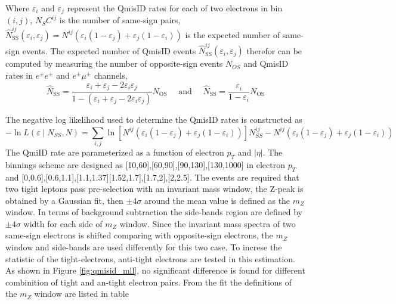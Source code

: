 Where $\varepsilon_{i}$ and $\varepsilon_{j}$ represent the QmisID rates for each of two electrons in bin$(i,j)$, $N_SC^{i j}$ is the number of same-sign pairs,$\hat{N}_{\mathrm{SS}}^{i j}\left(\varepsilon_{i}, \varepsilon_{j}\right) = N^{ij}(\varepsilon_{i}(1-\varepsilon_{j})+\varepsilon_{j}(1-\varepsilon_{i}))$ is the expected number of same-sign events. The expected number of QmisID events $\hat{N}_{\mathrm{SS}}^{i j}\left(\varepsilon_{i}, \varepsilon_{j}\right)$ therefor can be computed by measuring the number of opposite-sign events $N_{OS}$ and QmisID rates in $e^{\pm}e^{\pm}$ and $e^{\pm}\mu^{\pm}$ channels,
\begin{equation}
\hat{N}_{\mathrm{SS}}=\frac{\varepsilon_{i}+\varepsilon_{j}-2 \varepsilon_{i} \varepsilon_{j}}{1-\left(\varepsilon_{i}+\varepsilon_{j}-2 \varepsilon_{i} \varepsilon_{j}\right)} N_{\mathrm{OS}} \quad \text { and } \quad \hat{N}_{\mathrm{SS}}=\frac{\varepsilon_{i}}{1-\varepsilon_{i}} N_{\mathrm{OS}}
\end{equation}

The negative log likelihood used to determine the QmisID rates is constructed as 
\begin{equation}
-\ln L\left(\varepsilon \mid N_{S S}, N\right)=\sum_{i, j} \ln \left[N^{i j}\left(\varepsilon_{i}(1-\varepsilon_{j})+\varepsilon_{j}(1- \varepsilon_{i})\right)\right] N_{S S}^{i j}-N^{i j}\left(\varepsilon_{i}(1-\varepsilon_{j})+\varepsilon_{j}(1- \varepsilon_{i})\right)
 \end{equation}
The QmiID rate are parameterized as a function of electron $p_T$ and $|\eta|$. The binnings scheme are designed as [10,60],[60,90],[90,130],[130,1000] in electron $p_T$ and [0,0.6],[0.6,1.1],[1.1,1.37][1.52,1.7],[1.7,2],[2,2.5]. The events are required that two tight leptons pass pre-selection with an invariant mass window, the Z-peak is obtained by a Gaussian fit, then $\pm4\sigma$ around the mean value is defined as the $m_Z$ window. In terms of background subtraction the side-bands region are defined by $\pm4\sigma$ width for each side of $m_Z$ window. Since the invariant mass spectra of two same-sign electrons is shifted comparing with opposite-sign electrons, the $m_Z$ window and side-bands are used differently for this two case. To increse the statistic of the tight-electrons, anti-tight electrons are tested in this estimation. As shown in Figure \ref{fig:qmisid_mll}, no significant difference is found for different combinition of tight and an-tight electron pairs. From the fit the definitions of the $m_Z$ window are listed in table

